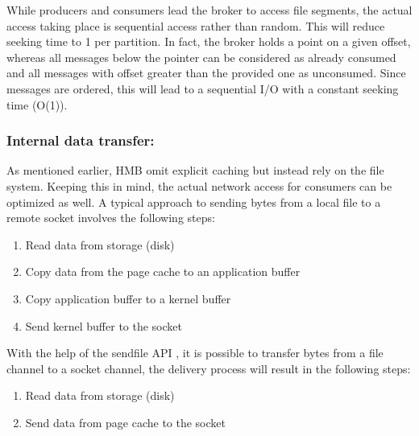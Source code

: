 While producers and consumers lead the broker to access
file segments, the actual access taking place is
sequential access rather than random. This will reduce seeking time to 1 per
partition. In fact, the broker holds a point on a given offset, whereas all
messages below the pointer can be considered as already consumed and all
messages with offset greater than the provided one as unconsumed. Since
messages are ordered, this will lead to a sequential I/O with a constant seeking
time (O(1)).


\subsubsection{Internal data transfer:}

As mentioned earlier, HMB omit explicit caching but instead rely on the file system.
Keeping this in mind, the actual network access for consumers can be optimized as well.
A typical approach to sending bytes from a local file to a remote
socket involves the following steps: 
\begin{enumerate}
  \item Read data from storage (disk)
  \item Copy data from the page cache to an application buffer
  \item Copy application buffer to a kernel buffer
  \item Send kernel buffer to the socket
\end{enumerate}

With the help of the sendfile API , it is possible to transfer bytes
from a file channel to a socket channel, the delivery process will
result in the following steps:

\begin{enumerate}
  \item Read data from storage (disk)
  \item Send data from page cache to the socket
\end{enumerate}
